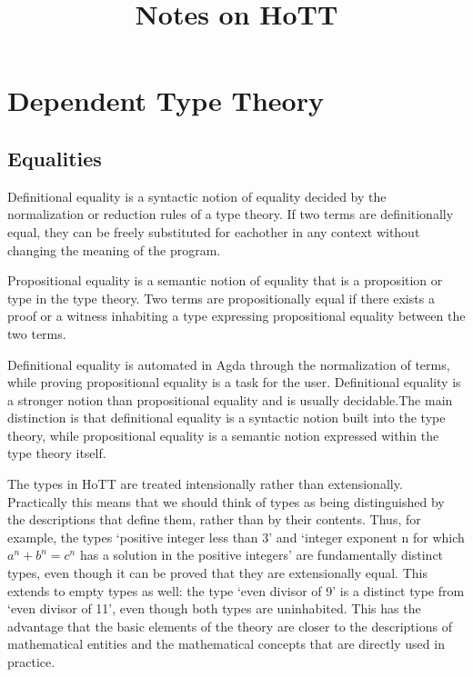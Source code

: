 \documentclass{article}
\title{Notes on HoTT}
\begin{document}
\section{Dependent Type Theory}
\subsection{Equalities}

\begin{definition}
  Definitional equality is a syntactic notion of equality decided by the normalization or reduction rules of a type theory. If two terms are definitionally equal, they can be freely substituted for eachother in any context without changing the meaning of the program.
\end{definition}

\begin{definition}
  Propositional equality is a semantic notion of equality that is a proposition or type in the type theory. Two terms are propositionally equal if there exists a proof or a witness inhabiting a type expressing propositional equality between the two terms.
\end{definition}

\begin{remark}
  Definitional equality is automated in Agda through the normalization of terms, while proving propositional equality is a task for the user. Definitional equality is a stronger notion than propositional equality and is usually decidable.The main distinction is that definitional equality is a syntactic notion built into the type theory, while propositional equality is a semantic notion expressed within the type theory itself.
\end{remark}

\begin{remark}
  The types in HoTT are treated intensionally rather than extensionally. Practically this means that we should think of types as being distinguished by the descriptions that define them, rather than by their contents. Thus, for example, the types ‘positive integer less than 3’ and ‘integer exponent n for which $a^n + b^n = c^n$ has a solution in the positive integers’ are fundamentally distinct types, even though it can be proved that they are extensionally equal. This extends to empty types as well: the type ‘even divisor of 9’ is a distinct type from ‘even divisor of 11’, even though both types are uninhabited. This has the advantage that the basic elements of the theory are closer to the descriptions of mathematical entities and the mathematical concepts that are directly used in practice.
\end{remark}
\end{document}
